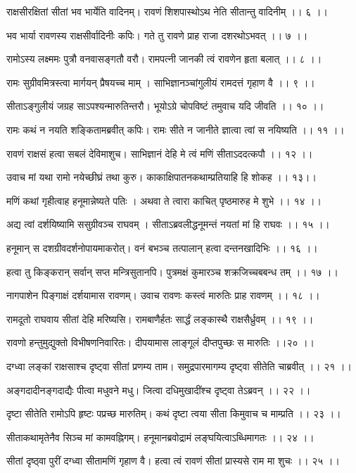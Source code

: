 राक्षसीरक्षितां सीतां भव भार्येति वादिनम्।
रावणं शिशपास्थोऽथ नेति सीतान्तु वादिनीम् ।। ६ ।।

भव भार्या रावणस्य राक्षसीर्वादिनीः कपिः।
गते तु रावणे प्राह राजा दशरथोऽभवत् ।। ७ ।।

रामोऽस्य लक्ष्ममः पुत्रौ वनवासङ्गतौ वरौ।
रामपत्नी जानकी त्वं रावणेन हृता बलात् ।। ८ ।।

रामः सुग्रीवमित्रस्त्वा मार्गयन् प्रैषयच्च माम् ।
साभिज्ञानञ्चांगुलीयं रामदत्तं गृहाण वै ।। ९ ।।

सीताऽङ्गुलीयं जग्रह साऽपश्यन्मारुतिन्तरौ।
भूयोऽग्रे चोपविष्टं तमुवाच यदि जीवति ।। १० ।।

रामः कथं न नयति शङ्कितामब्रवीत् कपिः।
रामः सीते न जानीते ज्ञात्वा त्वां स नयिष्यति ।। ११ ।।

रावणं राक्षसं हत्वा सबलं देविमाशुच।
साभिज्ञानं देहि मे त्वं मणिं सीताऽददत्कपौ ।। १२ ।।

उवाच मां यथा रामो नयेच्छीघ्रं तथा कुरु।
काकाक्षिपातनकथाम्प्रतियाहि हि शोकह ।। १३।।

मणिं कथां गृहीत्वाह हनूमान्नेष्यते पतिः ।
अथवा ते त्वारा काचित् पृष्ठमारुह मे शुभे ।। १४ ।।

अद्य त्वां दर्शयिष्यामि ससुग्रीवञ्च राघवम् ।
सीताऽब्रवलीद्धनूमन्तं नयतां मां हि राघवः ।। १५ ।।

हनूमान् स दशग्रीवदर्शनोपायमाकरोत्।
वनं बभञ्च तत्पालान् हत्वा दन्तनखादिभिः ।। १६ ।।

हत्वा तु किङ्करान् सर्वान् सप्त मन्त्रिसुतानपि।
पुत्रमक्षं कुमारञ्च शक्रजिच्चबबन्ध तम् ।। १७ ।।

नागपाशेन पिङ्गाक्षं दर्शयामास रावणम्।
उवाच रावणः कस्त्वं मारुतिः प्राह रावणम् ।। १८ ।।

रामदूतो राघवाय सीतां देहि मरिष्यसि।
रामबाणैर्हतः सार्द्धं लङ्कास्थै राक्षसैर्ध्रुवम् ।। १९ ।।

रावणो हन्तुमुद्युक्तो विभीषणनिवारितः।
दीपयामास लाङ्गूलं दीप्तपुच्छः स मारुतिः ।।२० ।।

दग्ध्वा लङ्कां राक्षसाश्च दृष्ट्वा सीतां प्रणम्य ताम।
समुद्रपारमागम्य दृष्ट्वा सीतेति चाब्रवीत् ।। २१ ।।

अङ्गदादीनङ्गदाद्यैः पीत्वा मधुवने मधु।
जित्वा दधिमुखादींश्च दृष्ट्वा तेऽब्रवन् ।। २२ ।।

दृष्टा सीतेति रामोऽपि हृष्टः पप्रच्छ मारुतिम्।
कथं दृष्टा त्वया सीता किमुवाच च माम्प्रति ।। २३ ।।

सीताकथामृतेनैव सिञ्च मां कामवह्निगम्।
हनूमानब्रवोद्रामं लङ्घयित्वाऽब्धिमागतः ।। २४ ।।

सीतां दृष्ठ्वा पुरीं दग्ध्वा सीतामणिं गृहाण वै।
हत्वा त्वं रावणं सीतां प्रास्यसे राम मा शुचः ।। २५ ।।

